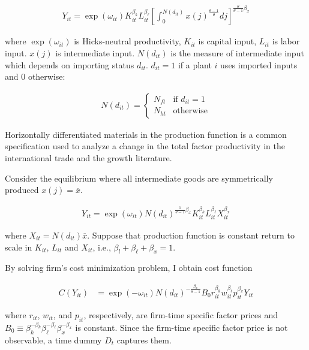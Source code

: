 \documentclass[11pt,letter]{article}
\newcounter{lem}[section] \setcounter{lem}{0}
\newcommand{\lprn}[1]{\left[{#1}\right]}
\begin{document}
\begin{appendices}
\begin{align}
Y_{it} = \exp(\omega_{it}) K_{it}^{\beta_k} L_{it}^{\beta_\ell} \lprn{\int_0^{N(d_{it})} x(j)^{\frac{\theta-1}{\theta}}dj}^{\frac{\theta}{\theta-1}\beta_x}
\end{align}

\noindent where $\exp(\omega_{it})$ is Hicks-neutral productivity, $K_{it}$ is capital input, $L_{it}$ is labor input. $x(j)$ is intermediate input. $N(d_{it})$ is the measure of intermediate input which depends on importing status $d_{it}$. $d_{it}=1$ if a plant $i$ uses imported inputs and 0 otherwise:

\begin{align*}
N(d_{it}) =
\begin{cases}
N_{ft} & \text{if } d_{it}=1 \\
N_{ht} & \text{otherwise} 
\end{cases}
\end{align*}

\noindent Horizontally differentiated materials in the production function is a common specification used to analyze a change in the total factor productivity in the international trade and the growth literature. 

Consider the equilibrium where all intermediate goods are symmetrically produced $x(j)=\overline{x}$.

\begin{align}
Y_{it} = \exp(\omega_{it}) N(d_{it})^{\frac{1}{\theta-1}\beta_x}K_{it}^{\beta_k} L_{it}^{\beta_\ell} X_{it}^{\beta_x}
\end{align}

\noindent where $X_{it} = N(d_{it})\overline{x}$. Suppose that production function is constant return to scale in $K_{it}$, $L_{it}$ and $X_{it}$, i.e., $\beta_l+\beta_\ell + \beta_x= 1$. 

By solving firm's cost minimization problem, I obtain cost function

\begin{align}
C(Y_{it}) &= \exp(-\omega_{it})N(d_{it})^{-\frac{\beta_x}{\theta-1}}B_0r_{it}^{\beta_k}w_{it}^{\beta_\ell}p_{it}^{\beta_x}Y_{it}
\end{align}

\noindent where $r_{it}$, $w_{it}$, and $p_{it}$, respectively, are firm-time specific factor prices and $B_0\equiv \beta_k^{-\beta_k}\beta_\ell^{-\beta_\ell}\beta_x^{-\beta_x}$ is constant. Since the firm-time specific factor price is not observable, a time dummy $D_t$ captures them. %


\end{appendices}
\end{document}
